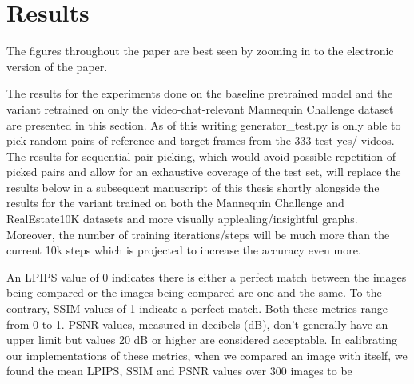 \section{Results}\label{sec2:results} 

The figures throughout the paper are
best seen by zooming in to the electronic version of the paper.


The results for the experiments done on the baseline pretrained model and the variant retrained on only the video-chat-relevant Mannequin Challenge dataset are presented in this section. As of this writing generator\_test.py is only able to pick random pairs of reference and target frames from the 333 test-yes/ videos. The results for sequential pair picking, which would avoid possible repetition of picked pairs and allow for an exhaustive coverage of the test set, will replace the results below in a subsequent manuscript of this thesis shortly alongside the results for the variant trained on both the Mannequin Challenge and RealEstate10K datasets and more visually applealing/insightful graphs. Moreover, the number of training iterations/steps will be much more than the current 10k steps which is projected to increase the accuracy even more. 

An LPIPS value of 0 indicates there is either a perfect match between the images being compared or the images being compared are one and the same. To the contrary, SSIM values of 1 indicate a perfect match. Both these metrics range from 0 to 1. PSNR values, measured in decibels (dB), don't generally have an upper limit but values 20 dB or higher are considered acceptable. In calibrating our implementations of these metrics, when we compared an image with itself, we found the mean LPIPS, SSIM and PSNR values over 300 images to be  



